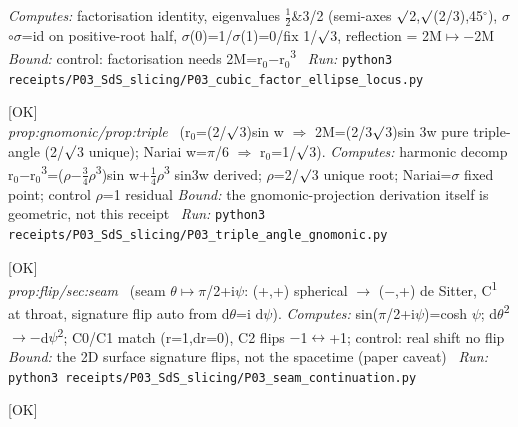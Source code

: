 \begin{description}
\emph{Computes:} factorisation identity, eigenvalues \ensuremath{\tfrac12}\&3/2 (semi-axes \ensuremath{\surd}2,\ensuremath{\surd}(2/3),45\ensuremath{^\circ}), \ensuremath{\sigma}\ensuremath{\circ}\ensuremath{\sigma}=id on positive-root half, \ensuremath{\sigma}(0)=1/\ensuremath{\sigma}(1)=0/fix 1/\ensuremath{\surd}3, reflection = 2M\ensuremath{\mapsto}\ensuremath{-}2M
 \emph{Bound:} control: factorisation needs 2M=r\ensuremath{_0}\ensuremath{-}r\ensuremath{_0}\textsuperscript{3}
\ \emph{Run:} \texttt{python3 receipts/P03\_SdS\_slicing/P03\_cubic\_factor\_ellipse\_locus.py}
\item[\label{rcpt:P03_triple_angle_gnomonic}\texttt{P03\_triple\_angle\_gnomonic}]\hfill\textsf{[OK]}\\
\textit{prop:gnomonic/prop:triple} \ (r\ensuremath{_0}=(2/\ensuremath{\surd}3)sin w \ensuremath{\Rightarrow} 2M=(2/3\ensuremath{\surd}3)sin 3w pure triple-angle (2/\ensuremath{\surd}3 unique); Nariai w=\ensuremath{\pi}/6 \ensuremath{\Rightarrow} r\ensuremath{_0}=1/\ensuremath{\surd}3). 
\emph{Computes:} harmonic decomp r\ensuremath{_0}\ensuremath{-}r\ensuremath{_0}\textsuperscript{3}=(\ensuremath{\rho}\ensuremath{-}\ensuremath{\tfrac34}\ensuremath{\rho}\textsuperscript{3})sin w+\ensuremath{\tfrac14}\ensuremath{\rho}\textsuperscript{3} sin3w derived; \ensuremath{\rho}=2/\ensuremath{\surd}3 unique root; Nariai=\ensuremath{\sigma} fixed point; control \ensuremath{\rho}=1 residual
 \emph{Bound:} the gnomonic-projection derivation itself is geometric, not this receipt
\ \emph{Run:} \texttt{python3 receipts/P03\_SdS\_slicing/P03\_triple\_angle\_gnomonic.py}
\item[\label{rcpt:P03_seam_continuation}\texttt{P03\_seam\_continuation}]\hfill\textsf{[OK]}\\
\textit{prop:flip/sec:seam} \ (seam \ensuremath{\theta}\ensuremath{\mapsto}\ensuremath{\pi}/2+i\ensuremath{\psi}: (+,+) spherical \ensuremath{\to} (\ensuremath{-},+) de Sitter, C\textsuperscript{1} at throat, signature flip auto from d\ensuremath{\theta}=i d\ensuremath{\psi}). 
\emph{Computes:} sin(\ensuremath{\pi}/2+i\ensuremath{\psi})=cosh \ensuremath{\psi}; d\ensuremath{\theta}\textsuperscript{2}\ensuremath{\to}\ensuremath{-}d\ensuremath{\psi}\textsuperscript{2}; C0/C1 match (r=1,dr=0), C2 flips \ensuremath{-}1\ensuremath{\leftrightarrow}+1; control: real shift no flip
 \emph{Bound:} the 2D surface signature flips, not the spacetime (paper caveat)
\ \emph{Run:} \texttt{python3 receipts/P03\_SdS\_slicing/P03\_seam\_continuation.py}
\item[\label{rcpt:P03_cubic_spacing}\texttt{P03\_cubic\_spacing}]\hfill\textsf{[OK]}\\

\end{description}
